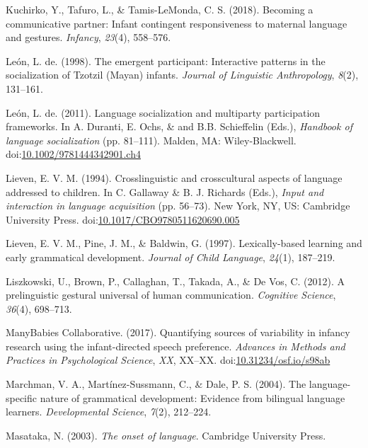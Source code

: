 \documentclass[floatsintext,man]{apa6}
\theoremstyle{definition}
\theoremstyle{definition}
\theoremstyle{definition}
\theoremstyle{remark}
\begin{document}
\hypertarget{ref-kuchirko2017becoming}{}
Kuchirko, Y., Tafuro, L., \& Tamis-LeMonda, C. S. (2018). Becoming a
communicative partner: Infant contingent responsiveness to maternal
language and gestures. \emph{Infancy}, \emph{23}(4), 558--576.

\hypertarget{ref-deleon1998emergent}{}
León, L. de. (1998). The emergent participant: Interactive patterns in
the socialization of Tzotzil (Mayan) infants. \emph{Journal of
Linguistic Anthropology}, \emph{8}(2), 131--161.

\hypertarget{ref-deleon2011language}{}
León, L. de. (2011). Language socialization and multiparty participation
frameworks. In A. Duranti, E. Ochs, \& and B.B. Schieffelin (Eds.),
\emph{Handbook of language socialization} (pp. 81--111). Malden, MA:
Wiley-Blackwell.
doi:\href{https://doi.org/10.1002/9781444342901.ch4}{10.1002/9781444342901.ch4}

\hypertarget{ref-lieven1994crosslinguistic}{}
Lieven, E. V. M. (1994). Crosslinguistic and crosscultural aspects of
language addressed to children. In C. Gallaway \& B. J. Richards (Eds.),
\emph{Input and interaction in language acquisition} (pp. 56--73). New
York, NY, US: Cambridge University Press.
doi:\href{https://doi.org/10.1017/CBO9780511620690.005}{10.1017/CBO9780511620690.005}

\hypertarget{ref-lieven1997lexically}{}
Lieven, E. V. M., Pine, J. M., \& Baldwin, G. (1997). Lexically-based
learning and early grammatical development. \emph{Journal of Child
Language}, \emph{24}(1), 187--219.

\hypertarget{ref-liszkowski2012prelinguistic}{}
Liszkowski, U., Brown, P., Callaghan, T., Takada, A., \& De Vos, C.
(2012). A prelinguistic gestural universal of human communication.
\emph{Cognitive Science}, \emph{36}(4), 698--713.

\hypertarget{ref-manybabies2017}{}
ManyBabies Collaborative. (2017). Quantifying sources of variability in
infancy research using the infant-directed speech preference.
\emph{Advances in Methods and Practices in Psychological Science},
\emph{XX}, XX--XX.
doi:\href{https://doi.org/10.31234/osf.io/s98ab}{10.31234/osf.io/s98ab}

\hypertarget{ref-marchman2004language}{}
Marchman, V. A., Martínez-Sussmann, C., \& Dale, P. S. (2004). The
language-specific nature of grammatical development: Evidence from
bilingual language learners. \emph{Developmental Science}, \emph{7}(2),
212--224.

\hypertarget{ref-masataka2003onset}{}
Masataka, N. (2003). \emph{The onset of language}. Cambridge University
Press.
\end{document}
